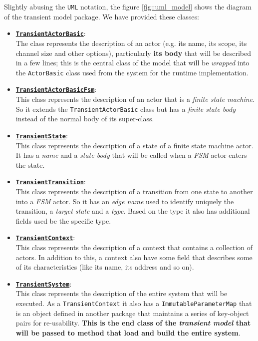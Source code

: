 Slightly abusing the \texttt{UML} notation, the figure \ref{fig::uml_model} shows the diagram of the transient model package. We have provided these classes:
\begin{itemize}
	\item
	\underline{\textbf{\texttt{TransientActorBasic}}}:\\
	The class represents the description of an actor (e.g. its name, its scope, its channel size and other options), particularly \textbf{its body} that will be described in a few lines; this is the central class of the model that will be \textit{wrapped} into the \texttt{ActorBasic} class used from the system for the runtime implementation.
	
	\item
	\underline{\textbf{\texttt{TransientActorBasicFsm}}}:\\
	This class represents the description of an actor that is a \textit{finite state machine}. So it extends the \texttt{TransientActorBasic} class but has a \textit{finite state body} instead of the normal body of its super-class.
	
	\item
	\underline{\textbf{\texttt{TransientState}}}:\\
	This class represents the description of a state of a finite state machine actor. It has a 	\textit{name} and a \textit{state body} that will be called when a \textit{FSM} actor enters the state.
	
	\item
	\underline{\textbf{\texttt{TransientTransition}}}:\\
	This class represents the description of a transition from one state to another into a \textit{FSM} actor. So it has an \textit{edge name} used to identify uniquely the transition, a \textit{target state} and a \textit{type}. Based on the type it also has additional fields used be the specific type.
	
	\item 
	\underline{\textbf{\texttt{TransientContext}}}:\\
	This class represents the description of a context that contains a collection of actors. In addition to this, a context also have some field that describes some of its characteristics (like its name, its address and so on).
	
	\item 
	\underline{\textbf{\texttt{TransientSystem}}}:\\
	This class represents the description of the entire system that will be executed. As a \texttt{TransientContext} it also has a \texttt{ImmutableParameterMap} that is an object defined in another package that maintains a series of key-object pairs for re-usability.
	\textbf{This is the end class of the \textit{transient model} that will be passed to method that load and build the entire system}.
\end{itemize}

